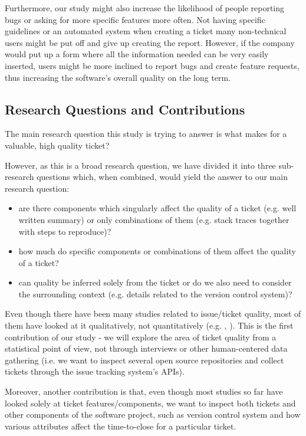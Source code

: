 \documentclass{mprop}
\begin{document}
Furthermore, our study might also increase the likelihood of people
reporting bugs or asking for more specific features more often. Not having specific 
guidelines or an automated system when creating a ticket many 
non-technical users might be put off and give up creating the report. 
However, if the company would put up a form where all the information
needed can be very easily inserted, users might be more inclined 
to report bugs and create feature requests, thus increasing the 
software's overall quality on the long term.

\subsection{Research Questions and Contributions}

The main research question this study is trying to answer is 
what makes for a valuable, high quality ticket?

However, as this is a broad research question, we have divided it into
three sub-research questions which, when combined, would yield the 
answer to our main research question:
  \begin{itemize}
    \item are there components which singularly affect the quality
      of a ticket (e.g. well written summary) or only combinations of them 
      (e.g. stack traces together with steps to reproduce)?
    \item how much do specific components or combinations of them 
      affect the quality of a ticket?
    \item can quality be inferred solely from the ticket or do we also
      need to consider the surrounding context (e.g. details related to
      the version control system)?
  \end{itemize}

Even though there have been many studies related to issue/ticket quality,
most of them have looked at it qualitatively, not quantitatively (e.g. 
\citet{bettenburg2008makes}, \citet{bettenburg2007quality}). This is 
the first contribution of our study - we will explore the area of 
ticket quality from a statistical point of view, not through interviews
or other human-centered data gathering (i.e. we want to inspect several
open source repositories and collect tickets through the issue tracking
system's APIs).

Moreover, another contribution is that,
even though most studies so far have looked solely at ticket 
features/components, we want to inspect both tickets and other components
of the software project, such as version control system and how various
attributes affect the time-to-close for a particular ticket. 
\end{document}
